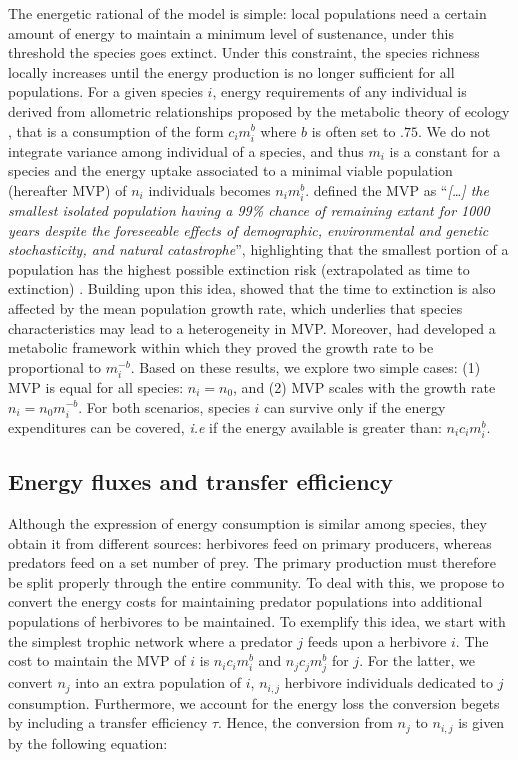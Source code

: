 The energetic rational of the model is simple: local populations need a
certain amount of energy to maintain a minimum level of sustenance,
under this threshold the species goes extinct. Under this constraint,
the species richness locally increases until the energy production is no
longer sufficient for all populations. For a given species \(i\), energy
requirements of any individual is derived from allometric relationships
proposed by the metabolic theory of ecology \citep{Brown2004}, that is a
consumption of the form \(c_im_i^b\) where \(b\) is often set to
\(.75\). We do not integrate variance among individual of a species, and
thus \(m_i\) is a constant for a species and the energy uptake
associated to a minimal viable population (hereafter MVP) of \(n_i\)
individuals becomes \(n_im_i^b\). \citet{Shaffer1981} defined the MVP as
``\emph{{[}\ldots{}{]} the smallest isolated population having a 99\%
chance of remaining extant for 1000 years despite the foreseeable
effects of demographic, environmental and genetic stochasticity, and
natural catastrophe}'', highlighting that the smallest portion of a
population has the highest possible extinction risk (extrapolated as
time to extinction) . Building upon this idea, \citet{Lande1993} showed
that the time to extinction is also affected by the mean population
growth rate, which underlies that species characteristics may lead to a
heterogeneity in MVP. Moreover, \citet{Savage2004} had developed a
metabolic framework within which they proved the growth rate to be
proportional to \(m_i^{-b}\). Based on these results, we explore two
simple cases: (1) MVP is equal for all species: \(n_i=n_0\), and (2) MVP
scales with the growth rate \(n_i=n_0m_i^{-b}\). For both scenarios,
species \(i\) can survive only if the energy expenditures can be
covered, \emph{i.e} if the energy available is greater than:
\(n_ic_im_i^b\).

\subsection{Energy fluxes and transfer
efficiency}\label{energy-fluxes-and-transfer-efficiency}

Although the expression of energy consumption is similar among species,
they obtain it from different sources: herbivores feed on primary
producers, whereas predators feed on a set number of prey. The primary
production must therefore be split properly through the entire
community. To deal with this, we propose to convert the energy costs for
maintaining predator populations into additional populations of
herbivores to be maintained. To exemplify this idea, we start with the
simplest trophic network where a predator \(j\) feeds upon a herbivore
\(i\). The cost to maintain the MVP of \(i\) is \(n_ic_im_i^b\) and
\(n_jc_jm_j^b\) for \(j\). For the latter, we convert \(n_j\) into an
extra population of \(i\), \(n_{i,j}\) herbivore individuals dedicated
to \(j\) consumption. Furthermore, we account for the energy loss the
conversion begets by including a transfer efficiency \(\tau\). Hence,
the conversion from \(n_{j}\) to \(n_{i,j}\) is given by the following
equation:

